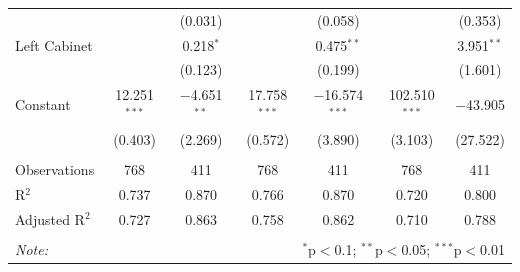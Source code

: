 \documentclass[
  11pt,
]{article}
\begin{document}
\begin{table}[!htbp]
\begin{tabular}{@{\extracolsep{5pt}}lcccccc}
  &  & (0.031) &  & (0.058) &  & (0.353) \\ 
  Left Cabinet &  & 0.218$^{*}$ &  & 0.475$^{**}$ &  & 3.951$^{**}$ \\ 
  &  & (0.123) &  & (0.199) &  & (1.601) \\ 
  Constant & 12.251$^{***}$ & $-$4.651$^{**}$ & 17.758$^{***}$ & $-$16.574$^{***}$ & 102.510$^{***}$ & $-$43.905 \\ 
  & (0.403) & (2.269) & (0.572) & (3.890) & (3.103) & (27.522) \\ 
 \hline \\[-1.8ex] 
Observations & 768 & 411 & 768 & 411 & 768 & 411 \\ 
R$^{2}$ & 0.737 & 0.870 & 0.766 & 0.870 & 0.720 & 0.800 \\ 
Adjusted R$^{2}$ & 0.727 & 0.863 & 0.758 & 0.862 & 0.710 & 0.788 \\ 
\hline 
\hline \\[-1.8ex] 
\textit{Note:}  & \multicolumn{6}{r}{$^{*}$p$<$0.1; $^{**}$p$<$0.05; $^{***}$p$<$0.01} \\ 
\end{tabular} 
\end{table}
\end{document}
